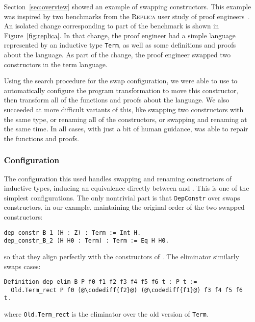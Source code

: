 Section~\ref{sec:overview} showed an example of swapping constructors.
This example was inspired by two benchmarks from the \textsc{Replica} user study of proof engineers~\cite{replica}.
An isolated change corresponding to part of the benchmark is shown in Figure~\ref{fig:replica}.
In that change, the proof engineer had a simple language represented by an inductive type \lstinline{Term},
as well as some definitions and proofs about the language.
As part of the change, the proof engineer swapped two constructors in the term language.

Using the search procedure for the swap configuration, we were able to use \toolname
to automatically configure the program transformation to move this constructor,
then transform all of the functions and proofs about the language.
We also succeeded at more difficult variants of this,
like swapping two constructors with the same type, or renaming all of the constructors,
or swapping and renaming at the same time.
In all cases, with just a bit of human guidance, \toolname was able to repair the functions and proofs.

\subsubsection{Configuration}

The configuration this used handles swapping and renaming constructors of inductive types,
inducing an equivalence directly between \A and \B.
This is one of the simplest configurations.
The only nontrivial part is that \lstinline{DepConstr} over \B swaps constructors, in our example,
maintaining the original order of the two swapped constructors:

\begin{lstlisting}
dep_constr_B_1 (H : Z) : Term := Int H.
dep_constr_B_2 (H H0 : Term) : Term := Eq H H0.
\end{lstlisting}
so that they align perfectly with the constructors of \A.
The eliminator similarly swaps cases:

\begin{lstlisting}
Definition dep_elim_B P f0 f1 f2 f3 f4 f5 f6 t : P t :=
  Old.Term_rect P f0 (@\codediff{f2}@) (@\codediff{f1}@) f3 f4 f5 f6 t.
\end{lstlisting}
where \lstinline{Old.Term_rect} is the eliminator over the old version of \lstinline{Term}.

